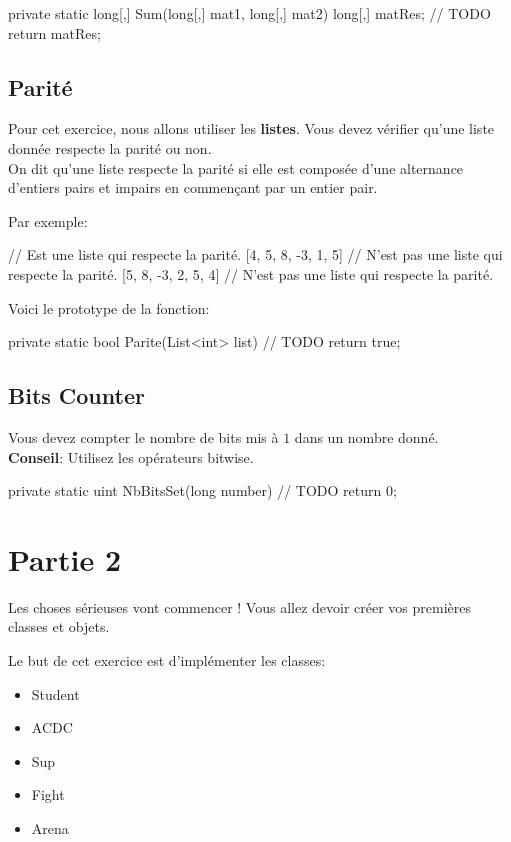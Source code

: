 \begin{code}
private static long[,] Sum(long[,] mat1, long[,] mat2)
{
	long[,] matRes;
	// TODO
    return matRes;
}
\end{code}

\subsection{Parité}

Pour cet exercice, nous allons utiliser les \textbf{listes}. Vous devez vérifier qu'une liste donnée respecte la parité ou non.\\

On dit qu'une liste respecte la parité si elle est composée d'une alternance d'entiers pairs et impairs en commençant par un entier pair.

Par exemple:

\begin{code}
[4, 5, 8, -3, 2, 5] // Est une liste qui respecte la parité.
[4, 5, 8, -3, 1, 5] // N'est pas une liste qui respecte la parité.
[5, 8, -3, 2, 5, 4] // N'est pas une liste qui respecte la parité.
\end{code}

Voici le prototype de la fonction:
\begin{code}
private static bool Parite(List<int> list)
{
	// TODO
    return true;
}
\end{code}

\subsection{Bits Counter}

Vous devez compter le nombre de bits mis à \(1\) dans un nombre donné.\\

\textbf{Conseil}: Utilisez les opérateurs bitwise.

\begin{code}
private static uint NbBitsSet(long number)
{
	// TODO
    return 0;
}
\end{code}

\newpage
\section{Partie 2}

Les choses sérieuses vont commencer ! Vous allez devoir créer vos premières classes et objets.

Le but de cet exercice est d'implémenter les classes:
\begin{itemize}
\item Student 
\item ACDC 
\item Sup 
\item Fight
\item Arena\\
\end{itemize}

